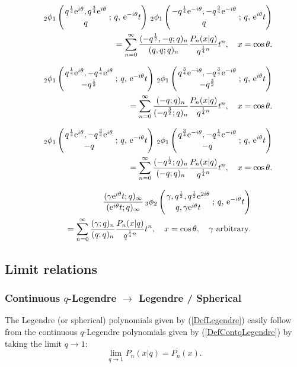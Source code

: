 \documentclass[envcountchap,graybox]{svmono}
\newcounter{rom}
\newcommand{\qhyp}[5]{\mbox{}_{#1}{\phi}_{#2}
\left(\genfrac{}{}{0pt}{}{#3}{#4}\,;\,q,\,#5\right)}
\newcommand{\e}{\textrm{e}}
\newcommand{\qhyp}[5]{\,\mbox{}_{#1}\phi_{#2}\!\left(
  \genfrac{}{}{0pt}{}{#3}{#4};#5\right)}
\begin{document}
\begin{eqnarray}
\label{GenContqLegendre4}
& &\qhyp{2}{1}{q^{\frac{1}{4}}\e^{i\theta},q^{\frac{3}{4}}\e^{i\theta}}{q}{\e^{-i\theta}t}\,
\qhyp{2}{1}{-q^{\frac{1}{4}}\e^{-i\theta},-q^{\frac{3}{4}}\e^{-i\theta}}{q}{\e^{i\theta}t}\nonumber\\
& &{}=\sum_{n=0}^{\infty}\frac{(-q^{\frac{1}{2}},-q;q)_n}{(q,q;q)_n}
\frac{P_n(x|q)}{q^{\frac{1}{4}n}}t^n,\quad x=\cos\theta.
\end{eqnarray}

\begin{eqnarray}
\label{GenContqLegendre5}
& &\qhyp{2}{1}{q^{\frac{1}{4}}\e^{i\theta},-q^{\frac{1}{4}}\e^{i\theta}}{-q^{\frac{1}{2}}}{\e^{-i\theta}t}\,
\qhyp{2}{1}{q^{\frac{3}{4}}\e^{-i\theta},-q^{\frac{3}{4}}\e^{-i\theta}}{-q^{\frac{3}{2}}}{\e^{i\theta}t}\nonumber\\
& &{}=\sum_{n=0}^{\infty}\frac{(-q;q)_n}{(-q^{\frac{3}{2}};q)_n}
\frac{P_n(x|q)}{q^{\frac{1}{4}n}}t^n,\quad x=\cos\theta.
\end{eqnarray}

\begin{eqnarray}
\label{GenContqLegendre6}
& &\qhyp{2}{1}{q^{\frac{1}{4}}\e^{i\theta},-q^{\frac{3}{4}}\e^{i\theta}}{-q}{\e^{-i\theta}t}\,
\qhyp{2}{1}{q^{\frac{3}{4}}\e^{-i\theta},-q^{\frac{1}{4}}\e^{-i\theta}}{-q}{\e^{i\theta}t}\nonumber\\
& &{}=\sum_{n=0}^{\infty}\frac{(-q^{\frac{1}{2}};q)_n}{(-q;q)_n}
\frac{P_n(x|q)}{q^{\frac{1}{4}n}}t^n,\quad x=\cos\theta.
\end{eqnarray}

\begin{eqnarray}
\label{GenContqLegendre7}
& &\frac{(\gamma\e^{i\theta}t;q)_{\infty}}{(\e^{i\theta}t;q)_{\infty}}\,
\qhyp{3}{2}{\gamma,q^{\frac{1}{2}},q^{\frac{1}{2}}\e^{2i\theta}}{q,\gamma\e^{i\theta}t}{\e^{-i\theta}t}\nonumber\\
& &{}=\sum_{n=0}^{\infty}\frac{(\gamma;q)_n}{(q;q)_n}\frac{P_n(x|q)}{q^{\frac{1}{4}n}}t^n,
\quad x=\cos\theta,\quad\textrm{$\gamma$ arbitrary}.
\end{eqnarray}

\subsection*{Limit relations}

\subsubsection*{Continuous $q$-Legendre $\rightarrow$ Legendre / Spherical}
The Legendre (or spherical) polynomials given by (\ref{DefLegendre}) easily
follow from the continuous $q$-Legendre polynomials given by
(\ref{DefContqLegendre}) by taking the limit $q\rightarrow 1$:
\begin{equation}
\lim_{q\rightarrow 1}P_n(x|q)=P_n(x).
\end{equation}
\end{document}
